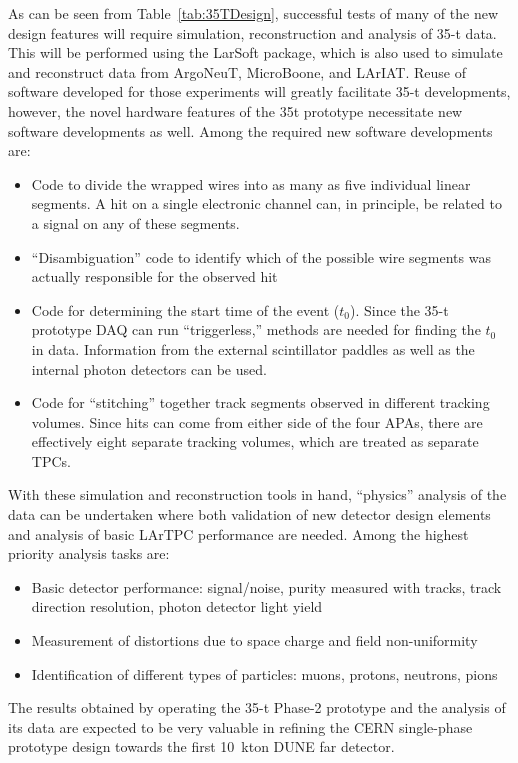 As can be seen from Table~\ref{tab:35TDesign}, successful tests of many of the new
design features will require simulation, reconstruction and analysis of 35-t data.
This will be performed using the LarSoft package, which is also used to simulate and
reconstruct data from ArgoNeuT, MicroBoone, and LArIAT.
Reuse of software developed for those experiments will greatly facilitate 35-t developments,
however, the novel hardware features of the 35t prototype necessitate new software developments
as well.
Among the required new software developments are:
\begin{itemize}
\item{Code to divide the wrapped wires into as many as five individual linear segments.
A hit on a single electronic channel can, in principle, be related to a
signal on any of these segments.}
\item{``Disambiguation'' code to identify which of the possible wire segments was actually responsible
for the observed hit}
\item{Code for determining the start time of the event ($t_0$). Since the 35-t prototype DAQ can
run ``triggerless,'' methods are needed for finding the $t_0$ in data. Information from the external
scintillator paddles as well as the internal photon detectors can be used.}
\item{Code for ``stitching'' together track segments observed in different tracking volumes.
Since hits can come from either side of the four APAs, there are
effectively eight separate tracking volumes,
which are treated as separate TPCs.}
\end{itemize}

With these simulation and reconstruction tools in hand, ``physics'' analysis of the data can be undertaken where
both validation of new detector design elements and analysis of basic LArTPC performance are needed.
Among the highest priority analysis tasks are:

\begin{itemize}
\item{Basic detector performance: signal/noise, purity measured with tracks, track direction resolution,
photon detector light yield}
\item{Measurement of distortions due to space charge and field non-uniformity}
\item{Identification of different types of particles: muons, protons, neutrons, pions}
\end{itemize}

The results obtained by operating the 35-t Phase-2 prototype and the analysis of its data are expected
to be very valuable in refining the CERN single-phase prototype design towards the first 10~kton DUNE far detector.
